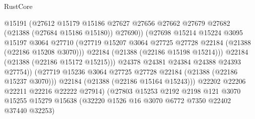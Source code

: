 \begin{lexlean}{RustCore}
\begin{coremodule}
                                      @15191
                                      (@27612
                                        @15179
                                        @15186
                                        @27627
                                        @27656
                                        @27662
                                        @27679
                                        @27682
                                        (@21388 (@27684 @15186 @15180))
                                        @27690))
                                    (@27698
                                      @15214
                                      @15224
                                      @3095
                                      @15197
                                      @3064
                                      @27710
                                      (@27719
                                        @15207
                                        @3064
                                        @27725
                                        @27728
                                        @22184
                                        (@21388 (@22186 @15208 @3070)))
                                      @22184
                                      (@21388 (@22186 @15198 @15214)))
                                    @22184
                                    (@21388 (@22186 @15172 @15215)))
                                  @24378
                                  @24381
                                  @24384
                                  @24388
                                  @24393
                                  @27754))
                              (@27719
                                @15236
                                @3064
                                @27725
                                @27728
                                @22184
                                (@21388 (@22186 @15237 @3070)))
                              @22184
                              (@21388 (@22186 @15164 @15243)))
                            @22202
                            @22206
                            @22211
                            @22216
                            @22222
                            @27914)
                          (@27803
                            @15253
                            @2192
                            @2198
                            @121
                            @3070
                            @15255
                            @15279
                            @15638
                            (@32220 @1526 @16 @3070 @6772 @7350 @22402 @37440 @32253)

\end{coremodule}
\end{lexlean}
